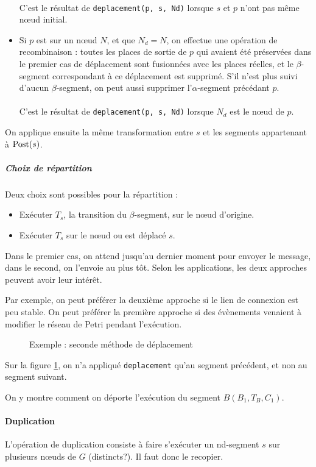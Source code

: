 \begin{itemize}
{~ \\
C'est le résultat de \texttt{deplacement(p, s, Nd)} lorsque $s$ et $p$ n'ont pas même nœud initial.
}
\\
\item Si $p$ est sur un nœud $N$, et que $N_d = N$, on effectue une opération de recombinaison : toutes les places de sortie de $p$ qui avaient été préservées dans le premier cas de déplacement sont fusionnées avec les places réelles, et le $\beta$-segment correspondant à ce déplacement est supprimé. S'il n'est plus suivi d'aucun $\beta$-segment, on peut aussi supprimer l'$\alpha$-segment précédant $p$.
~ \\
~ \\
C'est le résultat de \texttt{deplacement(p, s, Nd)} lorsque $N_d$ est le nœud de $p$.
\end{itemize}

On applique ensuite la même transformation entre $s$ et les segments appartenant à $\operatorname{Post}(s)$.

\subparagraph{Choix de répartition}
Deux choix sont possibles pour la répartition : 

\begin{itemize}
\item Exécuter $T_s$, la transition du $\beta$-segment, sur le nœud d'origine.
\item Exécuter $T_s$ sur le nœud ou est déplacé $s$.
\end{itemize}

Dans le premier cas, on attend jusqu'au dernier moment pour envoyer le message, dans le second, on l'envoie au plus tôt. Selon les applications, les deux approches peuvent avoir leur intérêt.

Par exemple, on peut préférer la deuxième approche si le lien de connexion est peu stable. On peut préférer la première approche si des évènements venaient à modifier le réseau de Petri pendant l'exécution.


\begin{figure}[H]
\centering

\caption{Exemple : seconde méthode de déplacement}
\label{fig:deplacementForm2}
\end{figure}

Sur la figure \ref{fig:deplacementForm2}, on n'a appliqué \texttt{deplacement} qu'au segment précédent, et non au segment suivant.

On y montre comment on déporte l'exécution du segment $B(B_1, T_B, C_1)$.

\paragraph{Duplication}
L'opération de duplication consiste à faire s'exécuter un nd-segment $s$ sur plusieurs nœuds de $G$ (distincts?). Il faut donc le recopier.


